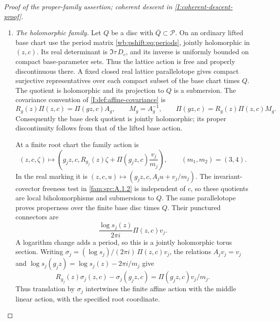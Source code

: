\begin{proof}[Proof of the proper-family assertion; coherent descent in \cref{I:coherent-descent-proof}]
\begin{enumerate}[label=\arabic*.,leftmargin=*]
\item \emph{The holomorphic family.}
Let $Q$ be a disc with $\overline Q\subset\mathcal P$.
On an ordinary lifted base chart use the period matrix
\eqref{wb:pshift:eq:periods}, jointly holomorphic in $(z,c)$.
Its real determinant is $\Im\tau\,D_c$, and its inverse is
uniformly bounded on compact base-parameter sets. Thus the lattice
action is free and properly discontinuous there. A fixed closed
real lattice parallelotope gives compact surjective representatives
over each compact subset of the base chart times $Q$.
The quotient is holomorphic and its projection to $Q$ is a submersion.
The covariance convention of \cref{I:def:affine-covariance} is
\[
 R_g(z)\Pi(z,c)=\Pi(gz,c)A_g,
 \qquad M_g=A_g^{-1},\qquad
 \Pi(gz,c)=R_g(z)\Pi(z,c)M_g.
\]
Consequently the base deck quotient is jointly holomorphic; its
proper discontinuity follows from that of the lifted base action.

At a finite root chart the family action is
\[
 (z,c,\zeta)\longmapsto
 \left(g_jz,c,R_{g_j}(z)\zeta+
             \Pi(g_jz,c)\frac{v_j}{m_j}\right),
 \qquad (m_1,m_2)=(3,4).
 \tag{PD7}
\]
In the real marking it is $(z,c,u)\mapsto(g_jz,c,A_ju+v_j/m_j)$.
The invariant-covector freeness test in \cref{fam:src:A.1.2}
is independent of $c$, so these quotients are local biholomorphisms
and submersions to $Q$. The same parallelotope proves properness
over the finite base disc times $Q$. Their punctured connectors are
\[
 \frac{\log s_j(z)}{2\pi i}\Pi(z,c)v_j.
 \tag{PD8}
\]
A logarithm change adds a period, so this is a jointly holomorphic
torus section. Writing $\sigma_j=(\log s_j)/(2\pi i)\,\Pi(z,c)v_j$, the
relations $A_jv_j=v_j$ and
$\log s_j(g_jz)=\log s_j(z)-2\pi i/m_j$ give
\[
 R_{g_j}(z)\sigma_j(z,c)-\sigma_j(g_jz,c)
       =\Pi(g_jz,c)v_j/m_j.
\]
Thus translation by $\sigma_j$ intertwines the finite affine action
with the middle linear action, with the specified root coordinate.


\end{enumerate}
\end{proof}
